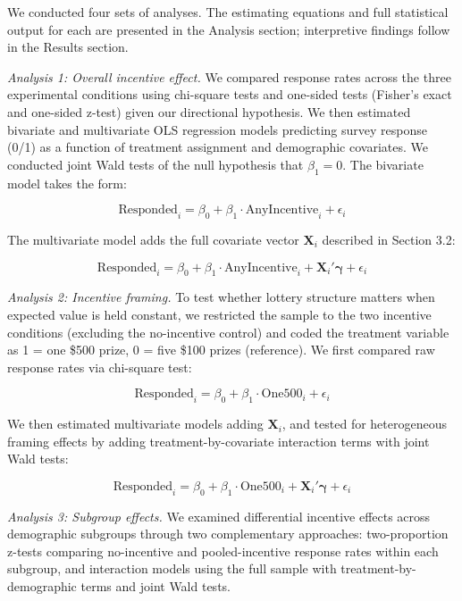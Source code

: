 \documentclass[12pt]{article}
\begin{document}
We conducted four sets of analyses. The estimating equations and full statistical output for each are presented in the Analysis section; interpretive findings follow in the Results section.

\textit{Analysis 1: Overall incentive effect.} We compared response rates across the three experimental conditions using chi-square tests and one-sided tests (Fisher's exact and one-sided z-test) given our directional hypothesis. We then estimated bivariate and multivariate OLS regression models predicting survey response (0/1) as a function of treatment assignment and demographic covariates. We conducted joint Wald tests of the null hypothesis that $\beta_1 = 0$. The bivariate model takes the form:

\begin{equation}
\text{Responded}_i = \beta_0 + \beta_1 \cdot \text{AnyIncentive}_i + \epsilon_i
\end{equation}

The multivariate model adds the full covariate vector $\mathbf{X}_i$ described in Section 3.2:

\begin{equation}
\text{Responded}_i = \beta_0 + \beta_1 \cdot \text{AnyIncentive}_i + \mathbf{X}_i'\boldsymbol{\gamma} + \epsilon_i
\end{equation}

\textit{Analysis 2: Incentive framing.} To test whether lottery structure matters when expected value is held constant, we restricted the sample to the two incentive conditions (excluding the no-incentive control) and coded the treatment variable as 1 = one \$500 prize, 0 = five \$100 prizes (reference). We first compared raw response rates via chi-square test:

\begin{equation}
\text{Responded}_i = \beta_0 + \beta_1 \cdot \text{One500}_i + \epsilon_i
\end{equation}

We then estimated multivariate models adding $\mathbf{X}_i$, and tested for heterogeneous framing effects by adding treatment-by-covariate interaction terms with joint Wald tests:

\begin{equation}
\text{Responded}_i = \beta_0 + \beta_1 \cdot \text{One500}_i + \mathbf{X}_i'\boldsymbol{\gamma} + \epsilon_i
\end{equation}

\textit{Analysis 3: Subgroup effects.} We examined differential incentive effects across demographic subgroups through two complementary approaches: two-proportion z-tests comparing no-incentive and pooled-incentive response rates within each subgroup, and interaction models using the full sample with treatment-by-demographic terms and joint Wald tests.
\end{document}
